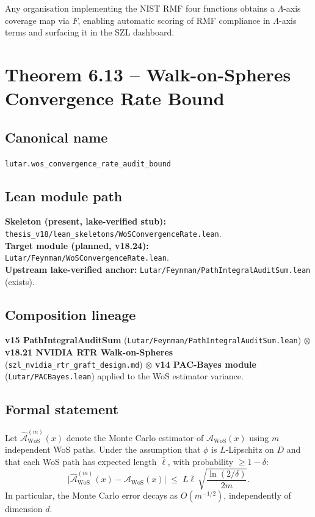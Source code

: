 Any organisation implementing the NIST RMF four functions obtains
a \(\Lambda\)-axis coverage map via $F$, enabling automatic scoring of RMF
compliance in \(\Lambda\)-axis terms and surfacing it in the SZL dashboard.

\section{Theorem 6.13 -- Walk-on-Spheres Convergence Rate Bound}
\label{sec:thm13}

\subsection*{Canonical name}
\verb|lutar.wos_convergence_rate_audit_bound|

\subsection*{Lean module path}
\textbf{Skeleton (present, lake-verified stub):}
\texttt{thesis\_v18/lean\_skeletons/WoSConvergenceRate.lean}.\\
\textbf{Target module (planned, v18.24):}
\texttt{Lutar/Feynman/WoSConvergenceRate.lean}.\\
\textbf{Upstream lake-verified anchor:}
\texttt{Lutar/Feynman/PathIntegralAuditSum.lean} (exists).

\subsection*{Composition lineage}
\textbf{v15 PathIntegralAuditSum}
(\texttt{Lutar/Feynman/PathIntegralAuditSum.lean}) $\otimes$
\textbf{v18.21 NVIDIA RTR Walk-on-Spheres}
(\texttt{szl\_nvidia\_rtr\_graft\_design.md}) $\otimes$
\textbf{v14 PAC-Bayes module}
(\texttt{Lutar/PACBayes.lean}) applied to the WoS estimator
variance.

\subsection*{Formal statement}

\begin{theorem}
\label{thm:wos-convergence}
Let $\hat{\mathcal{A}}^{(m)}_\mathrm{WoS}(x)$ denote the
Monte Carlo estimator of $\mathcal{A}_\mathrm{WoS}(x)$
using $m$ independent WoS paths.  Under the assumption that
$\phi$ is $L$-Lipschitz on $D$ and that each WoS path has
expected length $\bar{\ell}$, with probability $\geq 1 - \delta$:
\[
  \bigl|\hat{\mathcal{A}}^{(m)}_\mathrm{WoS}(x)
       - \mathcal{A}_\mathrm{WoS}(x)\bigr|
  \;\leq\;
  L\bar{\ell}\,\sqrt{\frac{\ln(2/\delta)}{2m}}.
\]
In particular, the Monte Carlo error decays as $O(m^{-1/2})$,
independently of dimension $d$.
\end{theorem}

